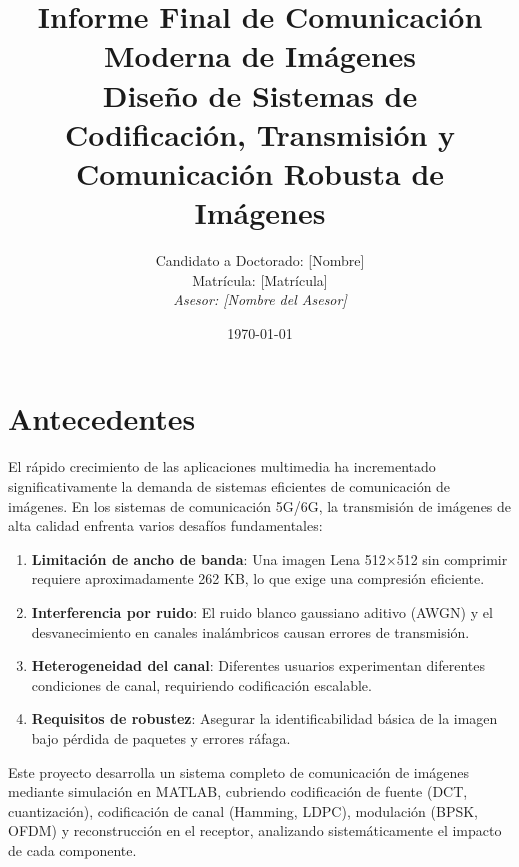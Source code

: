 \documentclass[12pt, a4paper]{article}
\title{
    \vspace{2cm}
    \textbf{Informe Final de Comunicaci\'on Moderna de Im\'agenes} \\
    \large Dise\~no de Sistemas de Codificaci\'on, Transmisi\'on y Comunicaci\'on Robusta de Im\'agenes
}
\author{
    Candidato a Doctorado: [Nombre] \\
    Matr\'icula: [Matr\'icula] \\
    \textit{Asesor: [Nombre del Asesor]}
}
\date{\today}
\begin{document}
\maketitle
\thispagestyle{empty}
\newpage

\tableofcontents
\newpage

\section{Antecedentes}

El r\'apido crecimiento de las aplicaciones multimedia ha incrementado significativamente la demanda de sistemas eficientes de comunicaci\'on de im\'agenes. En los sistemas de comunicaci\'on 5G/6G, la transmisi\'on de im\'agenes de alta calidad enfrenta varios desaf\'ios fundamentales:

\begin{enumerate}
    \item \textbf{Limitaci\'on de ancho de banda}: Una imagen Lena 512$\times$512 sin comprimir requiere aproximadamente 262 KB, lo que exige una compresi\'on eficiente.
    \item \textbf{Interferencia por ruido}: El ruido blanco gaussiano aditivo (AWGN) y el desvanecimiento en canales inal\'ambricos causan errores de transmisi\'on.
    \item \textbf{Heterogeneidad del canal}: Diferentes usuarios experimentan diferentes condiciones de canal, requiriendo codificaci\'on escalable.
    \item \textbf{Requisitos de robustez}: Asegurar la identificabilidad b\'asica de la imagen bajo p\'erdida de paquetes y errores r\'afaga.
\end{enumerate}

Este proyecto desarrolla un sistema completo de comunicaci\'on de im\'agenes mediante simulaci\'on en MATLAB, cubriendo codificaci\'on de fuente (DCT, cuantizaci\'on), codificaci\'on de canal (Hamming, LDPC), modulaci\'on (BPSK, OFDM) y reconstrucci\'on en el receptor, analizando sistem\'aticamente el impacto de cada componente.
\end{document}
